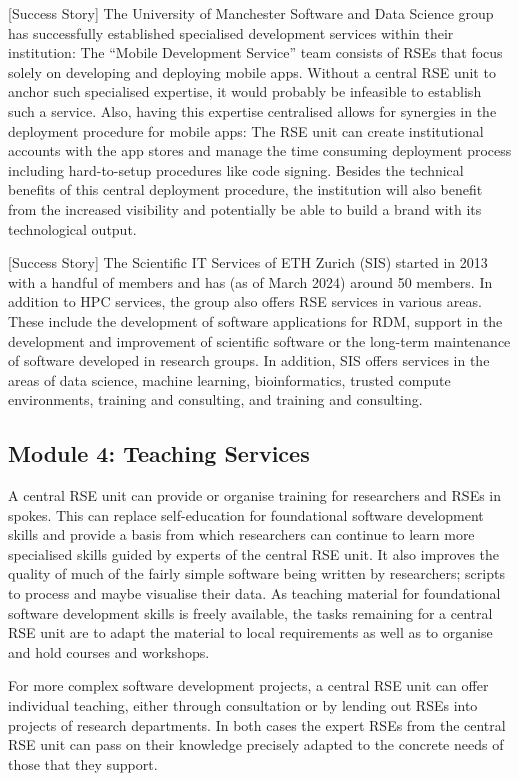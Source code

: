 \documentclass[a4paper]{article}
\begin{document}
[Success Story]
The University of Manchester Software and Data Science group has successfully established specialised development services within their institution:
The “Mobile Development Service” \autocite{manchester_mobile} team consists of RSEs that focus solely on developing and deploying mobile apps.
Without a central RSE unit to anchor such specialised expertise, it would probably be infeasible to establish such a service.
Also, having this expertise centralised allows for synergies in the deployment procedure for mobile apps:
The RSE unit can create institutional accounts with the app stores and manage the time consuming deployment process including hard-to-setup procedures like code signing.
Besides the technical benefits of this central deployment procedure, the institution will also benefit from the increased visibility and potentially be able to build a brand with its technological output.

[Success Story]
The Scientific IT Services of ETH Zurich (SIS) started in 2013 with a handful of members and has (as of March 2024) around 50 members.
In addition to HPC services, the group also offers RSE services in various areas.
These include the development of software applications for RDM, support in the development and improvement of scientific software or the long-term maintenance of software developed in research groups.
In addition, SIS offers services in the areas of data science, machine learning, bioinformatics, trusted compute environments, training and consulting, and training and consulting.

\subsection{Module 4: Teaching Services}%
\label{sec:teaching}

A central RSE unit can provide or organise training for researchers and RSEs in spokes.
This can replace self-education for foundational software development skills and provide a basis from which researchers can continue to learn more specialised skills guided by experts of the central RSE unit.
It also improves the quality of much of the fairly simple software being written by researchers; scripts to process and maybe visualise their data.
As teaching material for foundational software development skills is freely available,
the tasks remaining for a central RSE unit are to adapt the material to local requirements as well as to organise and hold courses and workshops.

For more complex software development projects, a central RSE unit can offer individual teaching, either through consultation or by lending out RSEs into projects of research departments.
In both cases the expert RSEs from the central RSE unit can pass on their knowledge precisely adapted to the concrete needs of those that they support.
\end{document}
